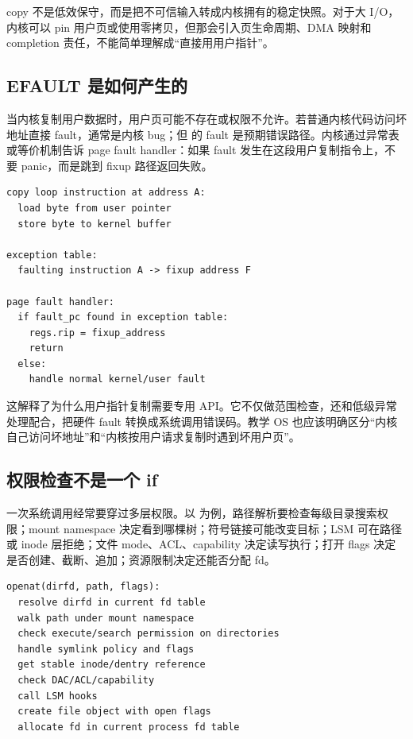 copy 不是低效保守，而是把不可信输入转成内核拥有的稳定快照。对于大 I/O，内核可以 pin 用户页或使用零拷贝，但那会引入页生命周期、DMA 映射和 completion 责任，不能简单理解成“直接用用户指针”。

\subsection{EFAULT 是如何产生的}

当内核复制用户数据时，用户页可能不存在或权限不允许。若普通内核代码访问坏地址直接 fault，通常是内核 bug；但  的 fault 是预期错误路径。内核通过异常表或等价机制告诉 page fault handler：如果 fault 发生在这段用户复制指令上，不要 panic，而是跳到 fixup 路径返回失败。

\begin{lstlisting}
copy loop instruction at address A:
  load byte from user pointer
  store byte to kernel buffer

exception table:
  faulting instruction A -> fixup address F

page fault handler:
  if fault_pc found in exception table:
    regs.rip = fixup_address
    return
  else:
    handle normal kernel/user fault
\end{lstlisting}

这解释了为什么用户指针复制需要专用 API。它不仅做范围检查，还和低级异常处理配合，把硬件 fault 转换成系统调用错误码。教学 OS 也应该明确区分“内核自己访问坏地址”和“内核按用户请求复制时遇到坏用户页”。

\subsection{权限检查不是一个 if}

一次系统调用经常要穿过多层权限。以  为例，路径解析要检查每级目录搜索权限；mount namespace 决定看到哪棵树；符号链接可能改变目标；LSM 可在路径或 inode 层拒绝；文件 mode、ACL、capability 决定读写执行；打开 flags 决定是否创建、截断、追加；资源限制决定还能否分配 fd。

\begin{lstlisting}
openat(dirfd, path, flags):
  resolve dirfd in current fd table
  walk path under mount namespace
  check execute/search permission on directories
  handle symlink policy and flags
  get stable inode/dentry reference
  check DAC/ACL/capability
  call LSM hooks
  create file object with open flags
  allocate fd in current process fd table
\end{lstlisting}

